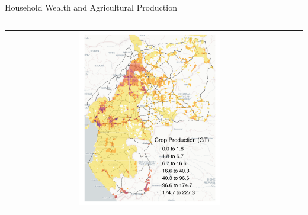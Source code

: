 \documentclass[aspectratio=169,xcolor=dvipsnames]{beamer}
\begin{document}
\begin{frame}{Household Wealth and Agricultural Production}
\begin{adjustbox}{center}
\begin{columns}
\begin{column}{0.85\textwidth}
{\begin{tabular}{@{}c@{}c@{}}
\includegraphics[width=0.5\textwidth, trim= {5mm 0 5mm 0}, clip]{"../figures/SPAM_CEMAC_TOP80.pdf"}
\end{tabular}
}
        \end{column}
    \end{columns}
  \end{adjustbox}
\end{frame}
\end{document}
